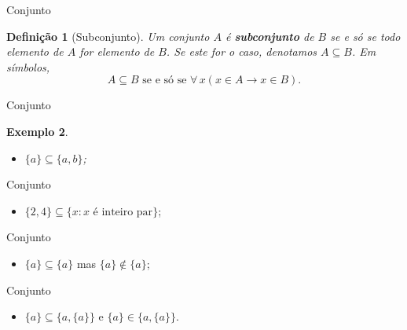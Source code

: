 \documentclass[10pt]{beamer}
\renewcommand{\indent}{\hspace*{2em}}
\theoremstyle{plain}
\newtheorem{defn}{Definição}[section]
\newtheorem{ex}[defn]{Exemplo}
\begin{document}
\begin{frame}{Conjunto}
\begin{defn}[Subconjunto]
\vfill\indent Um conjunto $A$ é \textbf{subconjunto} de $B$ se e só se todo elemento de $A$ for elemento de $B$. Se este for o caso, denotamos $A\subseteq B$. Em símbolos,
$$A\subseteq B\mbox{ se e só se }\forall\,x(x\in A\rightarrow x\in B).$$
\end{defn}
\end{frame}

\begin{frame}{Conjunto}
\begin{ex}
 \begin{itemize}
     \item $\{a\}\subseteq\{a,b\}$;
 \end{itemize}
\end{ex}
\end{frame}

\begin{frame}{Conjunto}
\begin{block}{}
 \begin{itemize}
     \item $\{2,4\}\subseteq\{x:x\mbox{ é inteiro par}\}$;
 \end{itemize}
\end{block}
\end{frame}

\begin{frame}{Conjunto}
\begin{block}{}
 \begin{itemize}
     \item $\{a\}\subseteq\{a\}$ mas $\{a\}\notin\{a\}$;
 \end{itemize}
\end{block}
\end{frame}

\begin{frame}{Conjunto}
\begin{block}{}
 \begin{itemize}
     \item $\{a\}\subseteq\{a,\{a\}\}$ e $\{a\}\in\{a,\{a\}\}$.
 \end{itemize}
\end{block}
\end{frame}
\end{document}
